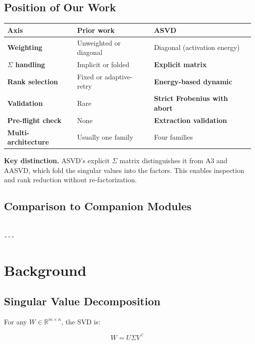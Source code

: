\subsection{Position of Our Work}

\begin{table}[H]
\centering
\small
\begin{tabular}{lll}
\toprule
\textbf{Axis} & \textbf{Prior work} & \textbf{ASVD} \\
\midrule
\textbf{Weighting} & Unweighted or diagonal & Diagonal (activation energy) \\
\textbf{$\Sigma$ handling} & Implicit or folded & \textbf{Explicit matrix} \\
\textbf{Rank selection} & Fixed or adaptive-retry & \textbf{Energy-based dynamic} \\
\textbf{Validation} & Rare & \textbf{Strict Frobenius with abort} \\
\textbf{Pre-flight check} & None & \textbf{Extraction validation} \\
\textbf{Multi-architecture} & Usually one family & Four families \\
\bottomrule
\end{tabular}
\end{table}

\textbf{Key distinction.} ASVD's explicit $\Sigma$ matrix distinguishes it from 
A3 and AASVD, which fold the singular values into the factors. This enables 
inspection and rank reduction without re-factorization.

\subsection{Comparison to Companion Modules}

\begin{lstlisting}

---
\end{lstlisting}


\section{Background}

\subsection{Singular Value Decomposition}

For any $W \in \mathbb{R}^{m \times n}$, the SVD is:

\[
W = U \Sigma V^\top
\]

